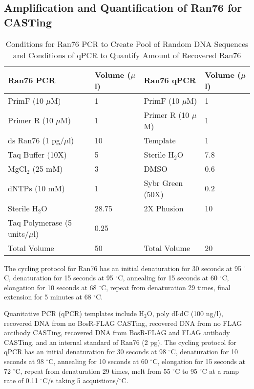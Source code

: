 \documentclass[12pt,twoside]{reedthesis}
\begin{document}
   \subsection{Amplification and Quantification of Ran76 for CASTing}
   
\begin{table}[H]
	\caption{Conditions for Ran76 PCR to Create Pool of Random DNA Sequences and Conditions of qPCR to Quantify Amount of Recovered Ran76} 
	\label{Ran76PCRandqPCR}
	\begin{tabular}{|l | l| |l| l|}
		\hline
		Ran76 PCR & Volume ($\mu$l) & Ran76 qPCR & Volume ($\mu$l) \\
		\hline 
		PrimF (10 $\mu$M) & 1 & PrimF (10 $\mu$M) & 1   \\ 
		Primer R (10 $\mu$M) & 1  & Primer R (10 $\mu$M) & 1  \\  			
		ds Ran76 (1 pg/$\mu$l) & 10  & Template &  1  \\
		Taq Buffer (10X) & 5 & Sterile H$_{2}$O & 7.8 \\ 
		MgCl$_{2}$ (25 mM) & 3 & DMSO & 0.6 \\  
		dNTPs (10 mM) & 1 & Sybr Green (50X) & 0.2 \\     
		Sterile H$_{2}$O & 28.75 & 2X Phusion & 10 \\
		Taq Polymerase (5 units/$\mu$l) & 0.25 & & \\
		\hline   
		Total Volume & 50 & Total Volume & 20  \\
		\hline
	\end{tabular}
\end{table}

The cycling protocol for Ran76 has an initial denaturation for 30 seconds at 95 $^{\circ}$C, denaturation for 15 seconds at 95 $^{\circ}$C, annealing for 15 seconds at 60 $^{\circ}$C, elongation for 10 seconds at 68 $^{\circ}$C, repeat from denaturation 29 times, final extension for 5 minutes at 68 $^{\circ}$C. 

Quanitative PCR (qPCR) templates include H$_{2}$O, poly dI$\cdot$dC (100 ng/\micro l), recovered DNA from no BosR-FLAG CASTing, recovered DNA from no FLAG antibody CASTing, recovered DNA from BosR-FLAG and FLAG antibody CASTing, and an internal standard of Ran76 (2 pg). The cycling protocol for qPCR has an initial denaturation for 30 seconds at 98 $^{\circ}$C, denaturation for 10 seconds at 98 $^{\circ}$C, annealing for 10 seconds at 60 $^{\circ}$C, elongation for 15 seconds at 72 $^{\circ}$C, repeat from denaturation 29 times, melt from 55 $^{\circ}$C to 95 $^{\circ}$C at a ramp rate of 0.11 $^{\circ}$C/s taking 5 acquistions/$^{\circ}$C.
\end{document}
